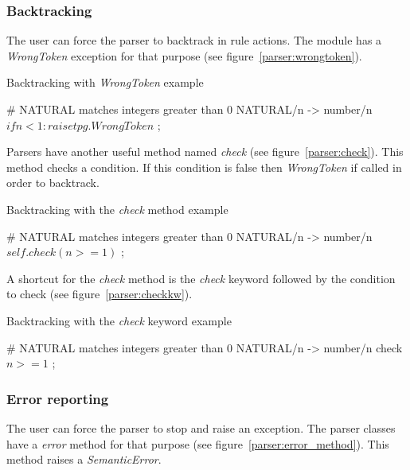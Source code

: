 \subsubsection{Backtracking}

The user can force the parser to backtrack in rule actions.
The module has a \emph{WrongToken} exception for that purpose (see figure~\ref{parser:wrongtoken}).

\begin{code}
\caption{Backtracking with \emph{WrongToken} example}           \label{parser:wrongtoken}
\begin{verbatimtab}[4]
    # NATURAL matches integers greater than 0
    NATURAL/n ->
        number/n
        $ if n<1: raise tpg.WrongToken $
        ;
\end{verbatimtab}
\end{code}

Parsers have another useful method named \emph{check} (see figure~\ref{parser:check}).
This method checks a condition.
If this condition is false then \emph{WrongToken} if called in order to backtrack.

\begin{code}
\caption{Backtracking with the \emph{check} method example}     \label{parser:check}
\begin{verbatimtab}[4]
    # NATURAL matches integers greater than 0
    NATURAL/n ->
        number/n
        $ self.check(n>=1) $
        ;
\end{verbatimtab}
\end{code}

A shortcut for the \emph{check} method is the \emph{check} keyword followed by the condition to check (see figure~\ref{parser:checkkw}).

\begin{code}
\caption{Backtracking with the \emph{check} keyword example}    \label{parser:checkkw}
\begin{verbatimtab}[4]
    # NATURAL matches integers greater than 0
    NATURAL/n ->
        number/n
        check $ n>=1 $
        ;
\end{verbatimtab}
\end{code}

\subsubsection{Error reporting}

The user can force the parser to stop and raise an exception.
The parser classes have a \emph{error} method for that purpose (see figure~\ref{parser:error_method}).
This method raises a \emph{SemanticError}.

